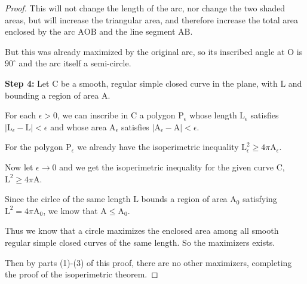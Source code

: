 \documentclass[a4paper]{book}
\numberwithin{theorem}{section}%
\begin{document}
\begin{proof}
    This will not change the length of the arc, nor change the two shaded areas, but will increase the triangular area, and therefore increase the total area enclosed by the arc $\mathrm{AOB}$ and the line segment $\mathrm{AB}$.

    But this was already maximized by the original arc, so its inscribed angle at $\mathrm{O}$ is $90^{\circ}$ and the arc itself a semi-circle.

    \textbf{Step 4:} Let $\mathrm{C}$ be a smooth, regular simple closed curve in the plane, with $\mathrm{L}$ and bounding a region of area $\mathrm{A}$.

    For each $\epsilon>0$, we can inscribe in $\mathrm{C}$ a polygon $\mathrm{P}_{\epsilon}$ whose length $\mathrm{L}_{\epsilon}$ satisfies $|\mathrm{L}_{\epsilon}-\mathrm{L}|<\epsilon$ and whose area $\mathrm{A}_{\epsilon}$ satisfies $|\mathrm{A}_{\epsilon}-\mathrm{A}|<\epsilon$.

    For the polygon $\mathrm{P}_{\epsilon}$ we already have the isoperimetric inequality $\mathrm{L}_{\epsilon}^{2}\geq4\pi\mathrm{A}_{\epsilon}$.

    Now let $\epsilon\to0$ and we get the isoperimetric inequality for the given curve $\mathrm{C}$, $\mathrm{L}^{2}\geq4\pi\mathrm{A}$.

    Since the cirlce of the same length $\mathrm{L}$ bounds a region of area $\mathrm{A}_{0}$ satisfying $\mathrm{L}^{2}=4\pi\mathrm{A}_{0}$, we know that $\mathrm{A}\leq\mathrm{A}_{0}$.

    Thus we know that a circle maximizes the enclosed area among all smooth regular simple closed curves of the same length. So the maximizers exists.

    Then by parts (1)-(3) of this proof, there are no other maximizers, completing the proof of the isoperimetric theorem.
\end{proof}
\end{document}
